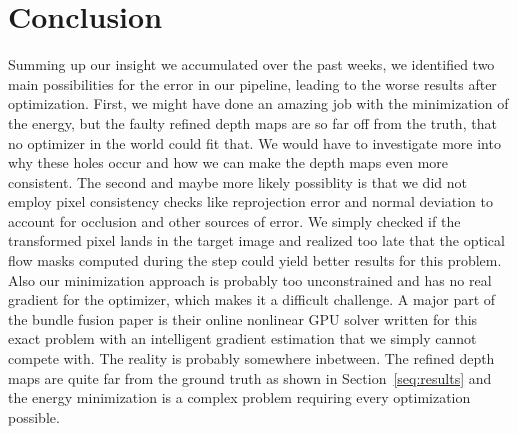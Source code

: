 \chapter{Conclusion}
    Summing up our insight we accumulated over the past weeks, we identified two main possibilities for the error in our pipeline, leading to the worse results after optimization. %
    First, we might have done an amazing job with the minimization of the energy, but the faulty refined depth maps are so far off from the truth, that no optimizer in the world could fit that.
    We would have to investigate more into why these holes occur and how we can make the depth maps even more consistent.
    The second and maybe more likely possiblity is that we did not employ pixel consistency checks like reprojection error and normal deviation to account for occlusion and other sources of error.
    We simply checked if the transformed pixel lands in the target image and realized too late that the optical flow masks computed during the  step could yield better results for this problem.
    Also our minimization approach is probably too unconstrained and has no real gradient for the optimizer, which makes it a difficult challenge.
    A major part of the bundle fusion paper is their online nonlinear GPU solver written for this exact problem with an intelligent gradient estimation that we simply cannot compete with.
    The reality is probably somewhere inbetween. 
    The refined depth maps are quite far from the ground truth as shown in Section~\ref{seq:results} and the energy minimization is a complex problem requiring every optimization possible.

